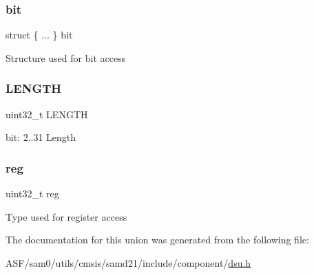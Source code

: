 \subsubsection{\texorpdfstring{bit}{bit}}
{\footnotesize\ttfamily struct \{ ... \}   bit}

Structure used for bit access \mbox{\label{union_d_s_u___l_e_n_g_t_h___type_a8daf77f63a1ab40042b7fd517a40e580}} 
\subsubsection{\texorpdfstring{LENGTH}{LENGTH}}
{\footnotesize\ttfamily uint32\+\_\+t L\+E\+N\+G\+TH}

bit\+: 2..31 Length \mbox{\label{union_d_s_u___l_e_n_g_t_h___type_a6b91636401516a477989a336376d7b40}} 
\subsubsection{\texorpdfstring{reg}{reg}}
{\footnotesize\ttfamily uint32\+\_\+t reg}

Type used for register access 

The documentation for this union was generated from the following file\+:\begin{DoxyCompactItemize}
\item 
A\+S\+F/sam0/utils/cmsis/samd21/include/component/\mbox{\hyperlink{component_2dsu_8h}{dsu.\+h}}\end{DoxyCompactItemize}
